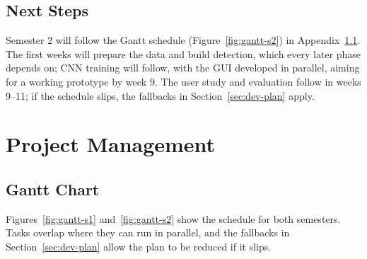 \documentclass[12pt,nonacm,acmlarge,titlepage,screen]{acmart}
\begin{document}
\subsection{Next Steps}
\label{sec:next-steps}
 Semester 2 will follow the Gantt schedule (Figure~\ref{fig:gantt-s2}) in Appendix~\ref{app:gantt}. The first weeks will prepare the data and build detection, which every later phase depends on; CNN training will follow, with the GUI developed in parallel, aiming for a working prototype by week 9. The user study and evaluation follow in weeks 9--11; if the schedule slips, the fallbacks in Section~\ref{sec:dev-plan} apply.




\newpage
\appendix

\raggedbottom %

\section{Project Management}
\label{app:pm}

\subsection{Gantt Chart}
\label{app:gantt}

Figures~\ref{fig:gantt-s1} and~\ref{fig:gantt-s2} show the schedule for both semesters. Tasks overlap where they can run in parallel, and the fallbacks in Section~\ref{sec:dev-plan} allow the plan to be reduced if it slips.
\end{document}
